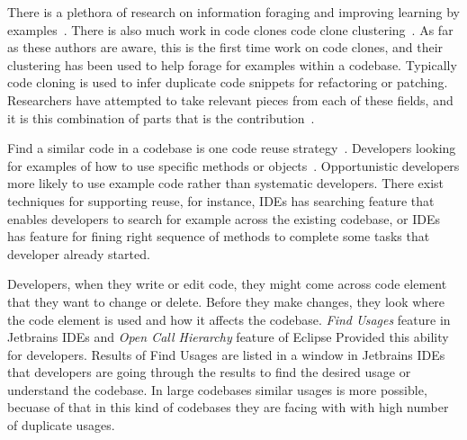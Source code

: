 \documentclass[conference]{IEEEtran}
\begin{document}
There is a plethora of research on information foraging and improving learning by examples~\cite{brandt2009two}. There is also much work in code clones code clone clustering~\cite{codeCloneDetection2019}. As far as these authors are aware, this is the first time work on code clones, and their clustering has been used to help forage for examples within a codebase. Typically code cloning is used to infer duplicate code snippets for refactoring or patching. Researchers have attempted to take relevant pieces from each of these fields, and it is this combination of parts that is the contribution~\cite{kapser2009toward}.\par


Find a similar code in a codebase is one code reuse strategy~\cite{rosson1996reuse}. Developers looking for examples of how to use specific methods or objects~\cite{stylos2006mica,umarji2008archetypal}. Opportunistic developers more likely to use example code rather than systematic developers. There exist techniques for supporting reuse, for instance, IDEs has searching feature that enables developers to search for example across the existing codebase, or IDEs has feature for fining right sequence of methods to complete some tasks that developer already started.\par

Developers, when they write or edit code, they might come across code element that they want to change or delete. Before they make changes, they look where the code element is used and how it affects the codebase. \textit{Find Usages} feature in Jetbrains IDEs and \textit{Open Call Hierarchy} feature of Eclipse Provided this ability for developers. Results of Find Usages are listed in  a window in Jetbrains IDEs that developers are going through the results to find the desired usage or understand the codebase. In large codebases similar usages is more possible, becuase of that in this kind of codebases they are facing with with high number of duplicate usages.
\par
\end{document}
